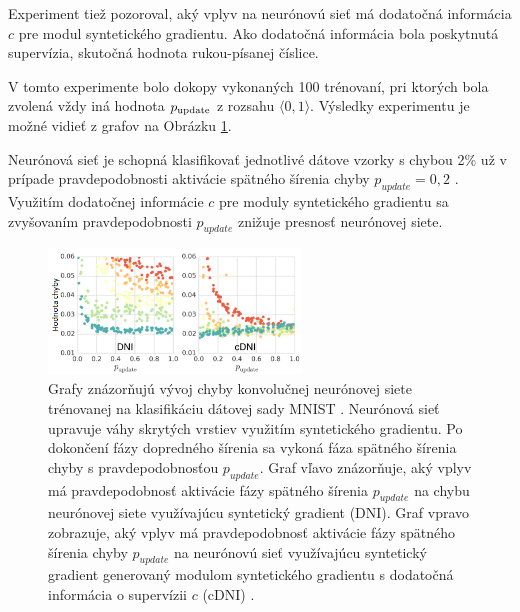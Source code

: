 Experiment tiež pozoroval, aký vplyv na neurónovú sieť má dodatočná informácia $c$ pre modul syntetického gradientu. Ako dodatočná informácia bola poskytnutá supervízia, skutočná hodnota rukou-písanej číslice.

V tomto experimente bolo dokopy vykonaných 100 trénovaní, pri ktorých bola zvolená vždy iná hodnota $p\textsubscript{update}$ z rozsahu $\langle 0, 1\rangle$. Výsledky experimentu je možné vidieť z grafov na Obrázku \ref{vysledkyExperimentuBpLambda}. 

Neurónová sieť je schopná klasifikovať jednotlivé dátove vzorky s chybou 2\% už v prípade pravdepodobnosti aktivácie spätného šírenia chyby $p_{update}=0,2$ \cite{Jaderberg2016}. Využitím dodatočnej informácie $c$ pre moduly syntetického gradientu sa zvyšovaním pravdepodobnosti $p_{update}$ znižuje presnosť neurónovej siete.


\begin{figure}
\centerline{\includegraphics[width=0.6\textwidth]{images/vysledkyExperimentuBpLambda}}
\caption[Podmienenie aktivácie spätného šírenia chyby pravdepodobnosťou $p\textsubscript{update}$]{Grafy znázorňujú vývoj chyby konvolučnej neurónovej siete trénovanej na klasifikáciu dátovej sady MNIST \cite{yann1998mnist}. Neurónová sieť upravuje váhy skrytých vrstiev využitím syntetického gradientu. Po dokončení fázy dopredného šírenia sa vykoná fáza spätného šírenia chyby s pravdepodobnosťou $p_{update}$. Graf vľavo znázorňuje, aký vplyv má pravdepodobnosť aktivácie fázy spätného šírenia $p_{update}$ na chybu neurónovej siete využívajúcu syntetický gradient (DNI). Graf vpravo zobrazuje, aký vplyv má pravdepodobnosť aktivácie fázy spätného šírenia chyby $p_{update}$ na neurónovú sieť využívajúcu syntetický gradient generovaný modulom syntetického gradientu s dodatočná informácia o supervízii $c$ (cDNI) \cite{Jaderberg2016}.}
\label{vysledkyExperimentuBpLambda}
\end{figure}

